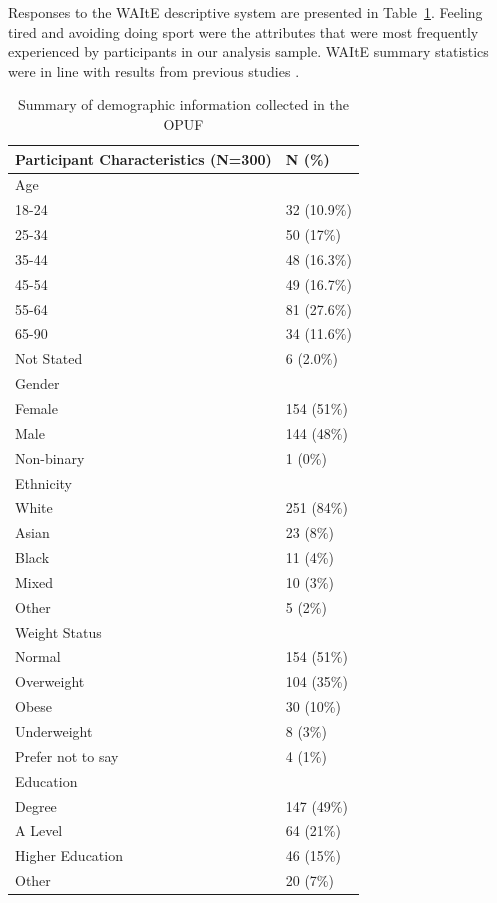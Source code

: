 \documentclass[
  number,
  preprint]{elsarticle}
\begin{document}
Responses to the WAItE descriptive system are presented in
Table~\ref{tbl-demographic}. Feeling tired and avoiding doing sport were
the attributes that were most frequently experienced by participants in
our analysis sample. WAItE summary statistics were in line with results
from previous studies \citep{Robinson2019EstimatingEvaluation}.

\begin{longtable}[]{@{}ll@{}}

\caption{\label{tbl-demographic}Summary of demographic information
collected in the OPUF}

\tabularnewline

\toprule\noalign{}
Participant Characteristics (N=300) & N (\%) \\
\midrule\noalign{}
\endhead
\bottomrule\noalign{}
\endlastfoot
Age & \\
18-24 & 32 (10.9\%) \\
25-34 & 50 (17\%) \\
35-44 & 48 (16.3\%) \\
45-54 & 49 (16.7\%) \\
55-64 & 81 (27.6\%) \\
65-90 & 34 (11.6\%) \\
Not Stated & 6 (2.0\%) \\
Gender & \\
Female & 154 (51\%) \\
Male & 144 (48\%) \\
Non-binary & 1 (0\%) \\
Ethnicity & \\
White & 251 (84\%) \\
Asian & 23 (8\%) \\
Black & 11 (4\%) \\
Mixed & 10 (3\%) \\
Other & 5 (2\%) \\
Weight Status & \\
Normal & 154 (51\%) \\
Overweight & 104 (35\%) \\
Obese & 30 (10\%) \\
Underweight & 8 (3\%) \\
Prefer not to say & 4 (1\%) \\
Education & \\
Degree & 147 (49\%) \\
A Level & 64 (21\%) \\
Higher Education & 46 (15\%) \\
Other & 20 (7\%) \\

\end{longtable}
\end{document}
